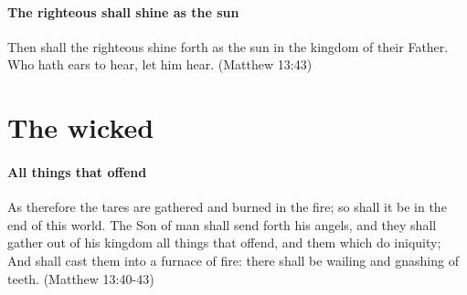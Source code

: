 \paragraph{The righteous shall shine as the sun}
Then shall the righteous shine forth as the sun in the kingdom of their Father. Who hath ears to hear, let him hear. (Matthew 13:43)

\section{The wicked}

\paragraph{All things that offend}
As therefore the tares are gathered and burned in the fire; so shall it be in the end of this world. The Son of man shall send forth his angels, and they shall gather out of his kingdom all things that offend, and them which do iniquity; And shall cast them into a furnace of fire: there shall be wailing and gnashing of teeth. (Matthew 13:40-43)

